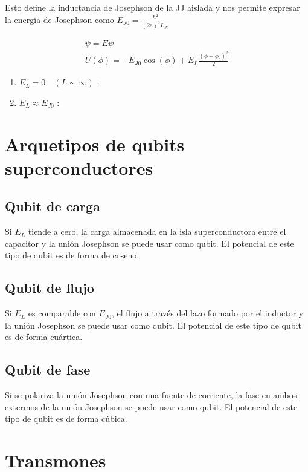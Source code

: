 Esto define la inductancia de Josephson de la JJ aislada y nos permite expresar la energía de Josephson como $E_{J0} = \frac{\hbar^2}{(2e)^2L_{J0}}$

\begin{align*}
[E_C (-i\hbar \frac{\partial}{\partial\phi}-n_g)^2 + U(\phi)] \psi = E \psi \\
U(\phi) = -E_{J0} \cos(\phi) + E_L \frac{(\phi-\phi_e)^2}{2}
\end{align*}

\begin{enumerate}
\item $E_L = 0 \quad (L \sim \infty)$ :
\item $E_L \approx E_{J0}$ :
\end{enumerate}

\section{Arquetipos de qubits superconductores}

\subsection{Qubit de carga}

Si $E_L$ tiende a cero, la carga almacenada en la isla superconductora entre el capacitor y  la unión Josephson se puede usar como qubit. El potencial de este tipo de qubit es de forma de coseno.

\subsection{Qubit de flujo}

Si $E_L$ es comparable con $E_{J0}$, el flujo a través del lazo formado por el inductor y la unión Josephson se puede usar como qubit. El potencial de este tipo de qubit es de forma cuártica.

\subsection{Qubit de fase}

Si se polariza la unión Josephson con una fuente de corriente, la fase en ambos extermos de la unión Josephson se puede usar como qubit. El potencial de este tipo de qubit es de forma cúbica.

\section{Transmones}

